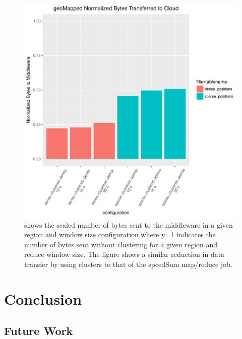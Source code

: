 \documentclass{thesis}
\begin{document}
    \begin{figure}
        \centering
        \includegraphics[scale=.8]{binImages/geoMapped-runplot-normalized.pdf}
        \caption{shows the scaled number of bytes sent to the middleware in a given region and window size
        configuration where y=1 indicates the number of bytes sent without clustering for a given region
        and reduce window size. The figure shows a similar reduction in data transfer by using clusters
        to that of the speedSum map/reduce job.}
    \end{figure}

\chapter{Conclusion}
\section{Future Work}

\end{document}
